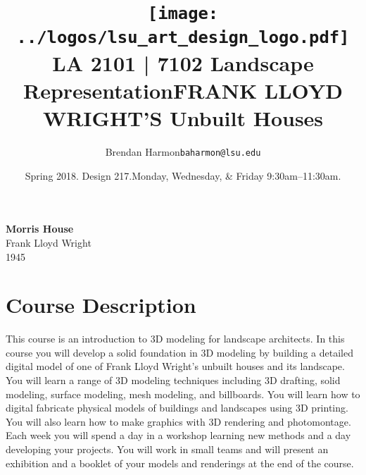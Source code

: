 \documentclass[11pt,article,oneside]{memoir}
\makeatletter
\def\myauthor{Author}
\def\mytitle{Title}
\def\mysubtitle{}
\def\myemail{baharmon@lsu.edu}
\def\myauthor{Brendan Harmon}
\def\mytitle{\texttt{[image: ../logos/lsu\_art\_design\_logo.pdf]} \\[0.1cm] {\normalsize \textsc{LA} 2101 | 7102\newline} \huge \bfseries Landscape Representation}
\def\mysubtitle{\Large FRANK LLOYD WRIGHT'S Unbuilt Houses}
\newcommand{\globalcolor}[1]{%
  \color{#1}\global\let\default@color\current@color
}
\makeatother
\begin{document}
\setlength\bibitemsep{0.75em}

\setmainfont{Lato Regular}
\setsansfont{Eaglefeather}
\setmonofont[Scale=0.8]{IBM Plex Mono}

\def\ind{\hangindent=1 true cm\hangafter=1 \noindent}
\def\labelitemi{$\cdot$}
\title{\LARGE \mytitle \newline \mysubtitle}     
\author{\Large\myauthor \newline \footnotesize\texttt{\noindent\myemail}}
\date{Spring 2018. Design 217.\newline Monday, Wednesday, \& Friday 9:30am--11:30am.}
\published{\,}


\globalcolor{black}
\vspace*{-10em}
\maketitle
{}
\vfill
\begin{center}
\noindent \textbf{Morris House} \\
Frank Lloyd Wright \\
\footnotesize{1945}
\end{center}
\clearpage


\globalcolor{black}
\vspace*{-10em}
\maketitle

\section{Course Description}
%
This course is an introduction to 3D modeling for landscape architects. 
In this course you will develop a solid foundation in 3D modeling
by building a detailed digital model of one of 
Frank Lloyd Wright's unbuilt houses and its landscape. 
%
You will learn a range of 3D modeling techniques including
3D drafting, solid modeling, surface modeling,  mesh modeling, and billboards. 
%
You will learn how to digital fabricate physical models 
of buildings and landscapes using 3D printing. 
%
You will also learn how to make graphics with
3D rendering and photomontage.
%
Each week you will spend a day in a workshop
learning new methods
and a day developing your projects.
%
You will work in small teams and 
will present an exhibition and a booklet of your
models and renderings at the end of the course.\\
\end{document}
